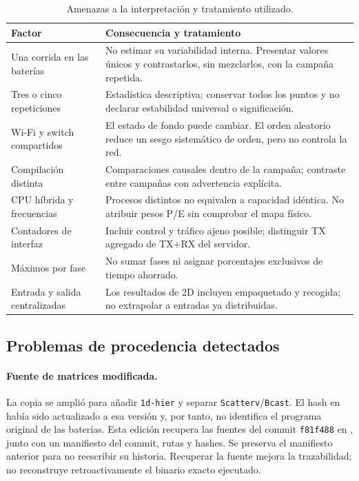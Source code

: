 \begin{table}[H]\centering\small
\caption{Amenazas a la interpretación y tratamiento utilizado.}
\begin{tabularx}{\linewidth}{p{3.7cm}X}
\toprule Factor & Consecuencia y tratamiento \\
\midrule
Una corrida en las baterías & No estimar su variabilidad interna. Presentar valores únicos y contrastarlos, sin mezclarlos, con la campaña repetida. \\
Tres o cinco repeticiones & Estadística descriptiva; conservar todos los puntos y no declarar estabilidad universal o significación. \\
Wi-Fi y switch compartidos & El estado de fondo puede cambiar. El orden aleatorio reduce un sesgo sistemático de orden, pero no controla la red. \\
Compilación distinta & Comparaciones causales dentro de la campaña; contraste entre campañas con advertencia explícita. \\
CPU híbrida y frecuencias & Procesos distintos no equivalen a capacidad idéntica. No atribuir pesos P/E sin comprobar el mapa físico. \\
Contadores de interfaz & Incluir control y tráfico ajeno posible; distinguir TX agregado de TX+RX del servidor. \\
Máximos por fase & No sumar fases ni asignar porcentajes exclusivos de tiempo ahorrado. \\
Entrada y salida centralizadas & Los resultados de 2D incluyen empaquetado y recogida; no extrapolar a entradas ya distribuidas. \\
\bottomrule
\end{tabularx}
\end{table}

\subsection{Problemas de procedencia detectados}

\paragraph{Fuente de matrices modificada.} La copia  se amplió para añadir \texttt{1d-hier} y separar \texttt{Scatterv}/\texttt{Bcast}. El hash en  había sido actualizado a esa versión y, por tanto, no identifica el programa original de las baterías. Esta edición recupera las fuentes del commit \texttt{f81f488} en , junto con un manifiesto del commit, rutas y hashes. Se preserva el manifiesto anterior para no reescribir su historia. Recuperar la fuente mejora la trazabilidad; no reconstruye retroactivamente el binario exacto ejecutado.


